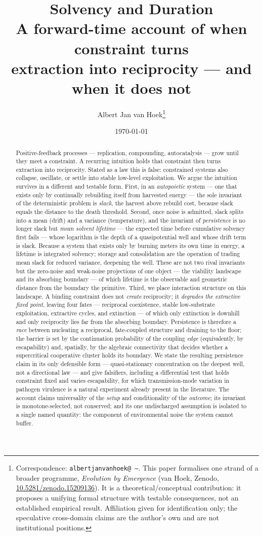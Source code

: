 \documentclass[11pt]{article}
\title{\textbf{Solvency and Duration}\\[4pt]
\large A forward-time account of when constraint turns\\ extraction into reciprocity --- and when it does not}
\author{Albert Jan van Hoek\thanks{Correspondence: \texttt{albertjanvanhoek@\,---}. This paper formalises one strand of a broader programme, \emph{Evolution by Emergence} (van Hoek, Zenodo, \href{https://doi.org/10.5281/zenodo.15209136}{10.5281/zenodo.15209136}). It is a theoretical/conceptual contribution: it proposes a unifying formal structure with testable consequences, not an established empirical result. Affiliation given for identification only; the speculative cross-domain claims are the author's own and are not institutional positions.}}
\date{\today}
\theoremstyle{plain}
\theoremstyle{definition}
\begin{document}
\maketitle

\begin{abstract}
\noindent Positive-feedback processes --- replication, compounding, autocatalysis --- grow until they meet a constraint. A recurring intuition holds that constraint then turns extraction into reciprocity. Stated as a law this is false: constrained systems also collapse, oscillate, or settle into stable low-level exploitation. We argue the intuition survives in a different and testable form. First, in an \emph{autopoietic} system --- one that exists only by continually rebuilding itself from harvested energy --- the sole invariant of the deterministic problem is \emph{slack}, the harvest above rebuild cost, because slack equals the distance to the death threshold. Second, once noise is admitted, slack splits into a mean (drift) and a variance (temperature), and the invariant of \emph{persistence} is no longer slack but \emph{mean solvent lifetime} --- the expected time before cumulative solvency first fails --- whose logarithm is the depth of a quasipotential well and whose drift term is slack. Because a system that exists only by burning meters its own time in energy, a lifetime is integrated solvency; storage and consolidation are the operation of trading mean slack for reduced variance, deepening the well. These are not two rival invariants but the zero-noise and weak-noise projections of one object --- the viability landscape and its absorbing boundary --- of which lifetime is the observable and geometric distance from the boundary the primitive. Third, we place interaction structure on this landscape. A binding constraint does not \emph{create} reciprocity; it \emph{degrades the extractive fixed point}, leaving four fates --- reciprocal coexistence, stable low-substrate exploitation, extractive cycles, and extinction --- of which only extinction is downhill and only reciprocity lies far from the absorbing boundary. Persistence is therefore a \emph{race} between nucleating a reciprocal, fate-coupled structure and draining to the floor; the barrier is set by the continuation probability of the coupling \emph{edge} (equivalently, by escapability) and, spatially, by the algebraic connectivity that decides whether a supercritical cooperative cluster holds its boundary. We state the resulting persistence claim in its only defensible form --- quasi-stationary concentration on the deepest well, not a directional law --- and give falsifiers, including a differential test that holds constraint fixed and varies escapability, for which transmission-mode variation in pathogen virulence is a natural experiment already present in the literature. The account claims universality of the \emph{setup} and conditionality of the \emph{outcome}; its invariant is monotone-selected, not conserved; and its one undischarged assumption is isolated to a single named quantity: the component of environmental noise the system cannot buffer.
\end{abstract}
\end{document}

